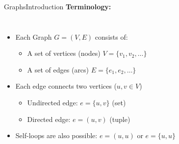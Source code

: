 \begin{frame}{Graphs}{Introduction}
  \textbf{Terminology:}
  \begin{columns}
    \begin{column}[b]{0.5\linewidth}
      \begin{figure}
        \begin{adjustbox}{width=0.75\linewidth}
          
        \end{adjustbox}
        \label{fig:graphs:introduction_undirected}
      \end{figure}
    \end{column}
    \begin{column}[b]{0.5\linewidth}
      \begin{figure}
        \begin{adjustbox}{width=0.75\linewidth}
          
        \end{adjustbox}
        \vspace{-1.0em}
        \label{fig:graphs:introduction_directed}
      \end{figure}
    \end{column}
  \end{columns}
  \begin{itemize}
    \item<3->
      Each Graph {\color{Mittel-Blau}$G = (V, E)$} consists of:
      \begin{itemize}
        \item<4->
          A set of vertices (nodes) {\color{Mittel-Blau}$ V = \{v_1, v_2, \dotsc\}$}
        \item<5->
          A set of edges (arcs) {\color{Mittel-Blau}$ E = \{e_1, e_2, \dotsc\}$}
       \end{itemize}
     \item<6->
       Each edge connects two vertices
       ({\color{Mittel-Blau}$u, v \in V$})
       \begin{itemize}
         \item<7->
           Undirected edge: {\color{Mittel-Blau}$e = \{u, v\}$} (set)
         \item<8->
           Directed edge: {\color{Mittel-Blau}$e = (u, v)$} (tuple)
        \end{itemize}
      \item<9->
        Self-loops are also possible:
        {\color{Mittel-Blau}$e = (u, u)$} or
        {\color{Mittel-Blau}$e = \{u, u\}$}
  \end{itemize}
\end{frame}

